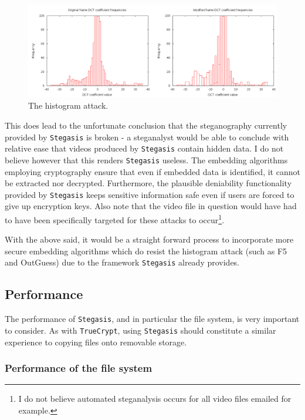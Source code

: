 \documentclass[paper=a4, fontsize=11pt,twoside]{scrartcl}
\numberwithin{table}{section}
\numberwithin{figure}{section}
\numberwithin{algorithm}{section}
\begin{document}
\begin{figure}[!tbh]
\centerline{\includegraphics[width=\textwidth]{images/hist.png}}
\caption{The histogram attack.}
\label{hist}
\end{figure}

This does lead to the unfortunate conclusion that the steganography currently provided by \texttt{Stegasis} is broken - a steganalyst would be able to conclude with relative ease that videos produced by \texttt{Stegasis} contain hidden data. I do not believe however that this renders \texttt{Stegasis} useless. The embedding algorithms employing cryptography ensure that even if embedded data is identified, it cannot be extracted nor decrypted. Furthermore, the plausible deniability functionality provided by \texttt{Stegasis} keeps sensitive information safe even if users are forced to give up encryption keys. Also note that the video file in question would have had to have been specifically targeted for these attacks to occur\footnote{I do not believe automated steganalysis occurs for all video files emailed for example.}.

With the above said, it would be a straight forward process to incorporate more secure embedding algorithms which do resist the histogram attack (such as F5 and OutGuess) due to the framework \texttt{Stegasis} already provides.

\subsection{Performance}
\label{perf}

The performance of \texttt{Stegasis}, and in particular the file system, is very important to consider. As with \texttt{TrueCrypt}, using \texttt{Stegasis} should constitute a similar experience to copying files onto removable storage. 

\subsubsection{Performance of the file system}
\end{document}
